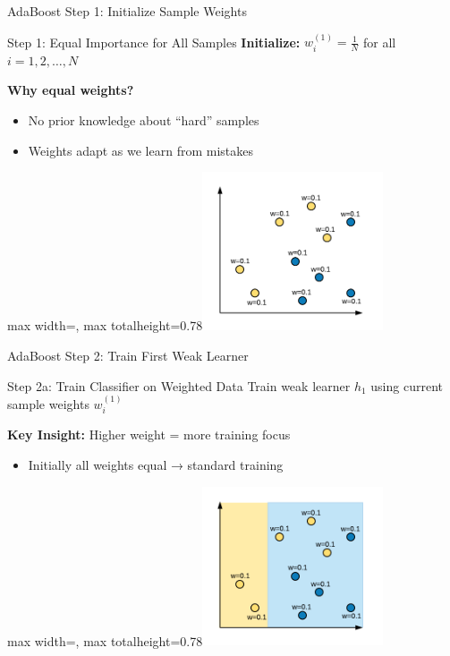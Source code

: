 \documentclass[10pt]{beamer}
\newcommand{\fitpic}[1]{\begin{adjustbox}{max width=\linewidth, max totalheight=0.78\textheight}#1\end{adjustbox}}
\begin{document}
\begin{frame}{AdaBoost Step 1: Initialize Sample Weights}
\begin{alertbox}{Step 1: Equal Importance for All Samples}
\textbf{Initialize:} $w_i^{(1)} = \frac{1}{N}$ for all $i = 1, 2, \ldots, N$
\end{alertbox}

\textbf{Why equal weights?}
\begin{itemize}
\item No prior knowledge about ``hard'' samples
\item Weights adapt as we learn from mistakes
\end{itemize}

  \vspace{0.3cm}
  \centering
  \fitpic{\includegraphics[width = 0.4\textwidth]{../assets/ensemble/diagrams/ada_data_init_weights}}
\end{frame}

\begin{frame}{AdaBoost Step 2: Train First Weak Learner}
\begin{alertbox}{Step 2a: Train Classifier on Weighted Data}
Train weak learner $h_1$ using current sample weights $w_i^{(1)}$
\end{alertbox}

\begin{keypointsbox}
\textbf{Key Insight:} Higher weight = more training focus
\begin{itemize}
\item Initially all weights equal → standard training
\end{itemize}
\end{keypointsbox}

  \vspace{0.3cm}
  \centering
  \fitpic{\includegraphics[width = 0.4\textwidth]{../assets/ensemble/diagrams/ada_iter1}}
\end{frame}
\end{document}
